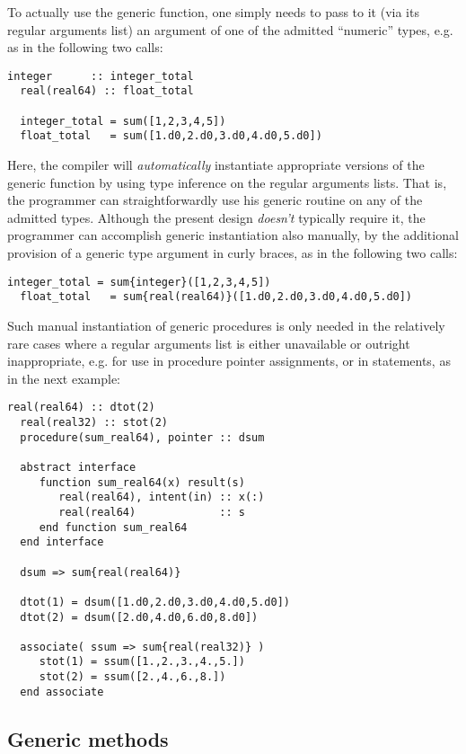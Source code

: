 \documentclass[11pt,oneside]{report}
\newcommand{\code}[1]{{\selectfont\ttfamily{#1}}}
\begin{document}
To actually use the \code{sum} generic function, one simply needs to
pass to it (via its regular arguments list) an argument of one of
the admitted ``numeric'' types, e.g. as in the following two calls:
\begin{lstlisting}[language=LFortran,style=boxed]
  integer      :: integer_total
  real(real64) :: float_total
  
  integer_total = sum([1,2,3,4,5])
  float_total   = sum([1.d0,2.d0,3.d0,4.d0,5.d0])
\end{lstlisting}
Here, the compiler will \emph{automatically} instantiate appropriate
versions of the \code{sum} generic function by using type inference on
the regular arguments lists. That is, the programmer can
straightforwardly use his generic routine on any of the admitted
types. Although the present design \emph{doesn't} typically require
it, the programmer can accomplish generic instantiation also manually,
by the additional provision of a generic type argument in curly
braces, as in the following two calls:
\begin{lstlisting}[language=LFortran,style=boxed]
  integer_total = sum{integer}([1,2,3,4,5])
  float_total   = sum{real(real64)}([1.d0,2.d0,3.d0,4.d0,5.d0])
\end{lstlisting}

Such manual instantiation of generic procedures is only needed in
the relatively rare cases where a regular arguments list is either
unavailable or outright inappropriate, e.g. for use in procedure
pointer assignments, or in \code{associate} statements, as in the next
example:
\begin{lstlisting}[language=LFortran,style=boxed]
  real(real64) :: dtot(2)
  real(real32) :: stot(2)
  procedure(sum_real64), pointer :: dsum

  abstract interface
     function sum_real64(x) result(s)
        real(real64), intent(in) :: x(:)
        real(real64)             :: s
     end function sum_real64  
  end interface
  
  dsum => sum{real(real64)}

  dtot(1) = dsum([1.d0,2.d0,3.d0,4.d0,5.d0])
  dtot(2) = dsum([2.d0,4.d0,6.d0,8.d0])

  associate( ssum => sum{real(real32)} )
     stot(1) = ssum([1.,2.,3.,4.,5.])
     stot(2) = ssum([2.,4.,6.,8.])     
  end associate
\end{lstlisting}

\subsection{Generic methods}
\label{sect:generic_methods}
\end{document}
